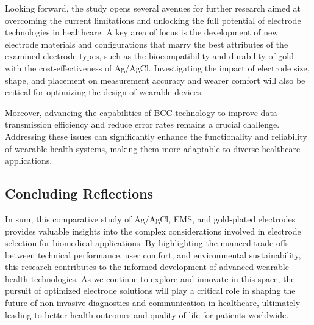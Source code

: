 \documentclass[conference]{IEEEtran}
\begin{document}
Looking forward, the study opens several avenues for further research aimed at overcoming the current limitations and unlocking the full potential of electrode technologies in healthcare. A key area of focus is the development of new electrode materials and configurations that marry the best attributes of the examined electrode types, such as the biocompatibility and durability of gold with the cost-effectiveness of Ag/AgCl. Investigating the impact of electrode size, shape, and placement on measurement accuracy and wearer comfort will also be critical for optimizing the design of wearable devices.

Moreover, advancing the capabilities of \gls{BCC} technology to improve data transmission efficiency and reduce error rates remains a crucial challenge. Addressing these issues can significantly enhance the functionality and reliability of wearable health systems, making them more adaptable to diverse healthcare applications.

\subsection{Concluding Reflections}

In sum, this comparative study of Ag/AgCl, \gls{EMS}, and gold-plated electrodes provides valuable insights into the complex considerations involved in electrode selection for biomedical applications. By highlighting the nuanced trade-offs between technical performance, user comfort, and environmental sustainability, this research contributes to the informed development of advanced wearable health technologies. As we continue to explore and innovate in this space, the pursuit of optimized electrode solutions will play a critical role in shaping the future of non-invasive diagnostics and communication in healthcare, ultimately leading to better health outcomes and quality of life for patients worldwide.







\end{document}
